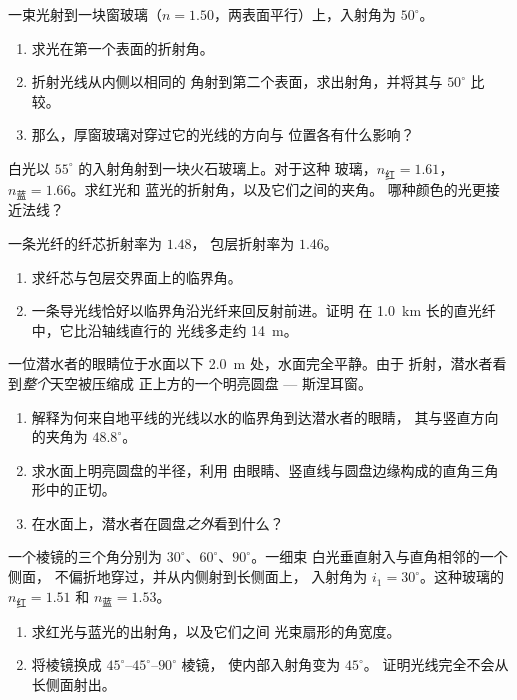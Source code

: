\begin{exercise}[$\star\star$]\label{exo:g10:refraction:9}
一束光射到一块窗玻璃（$n = 1.50$，两表面平行）上，入射角为 $50^\circ$。
\begin{enumerate}
  \item 求光在第一个表面的折射角。
  \item 折射光线从内侧以相同的
        角射到第二个表面，求出射角，并将其与 $50^\circ$ 比较。
  \item 那么，厚窗玻璃对穿过它的光线的方向与
        位置各有什么影响？
\end{enumerate}
\end{exercise}

\begin{exercise}[$\star\star$]\label{exo:g10:refraction:10}
白光以 $55^\circ$ 的入射角射到一块火石玻璃上。对于这种
玻璃，$n_{\text{红}} = 1.61$，$n_{\text{蓝}} = 1.66$。求红光和
蓝光的折射角，以及它们之间的夹角。
哪种颜色的光更接近法线？
\end{exercise}

\begin{exercise}[$\star\star$]\label{exo:g10:refraction:11}
一条光纤的纤芯折射率为 $1.48$，
包层折射率为 $1.46$。
\begin{enumerate}
  \item 求纤芯与包层交界面上的临界角。
  \item 一条导光线恰好以临界角沿光纤来回反射前进。证明
        在 \qty{1.0}{km} 长的直光纤中，它比沿轴线直行的
        光线多走约 \qty{14}{m}。
\end{enumerate}
\end{exercise}

\begin{exercise}[$\star\star\star$]\label{exo:g10:refraction:12}
一位潜水者的眼睛位于水面以下 \qty{2.0}{m} 处，水面完全平静。由于
折射，潜水者看到\emph{整个}天空被压缩成
正上方的一个明亮圆盘 --- 斯涅耳窗。
\begin{enumerate}
  \item 解释为何来自地平线的光线以水的临界角到达潜水者的眼睛，
        其与竖直方向的夹角为 $48.8^\circ$。
  \item 求水面上明亮圆盘的半径，利用
        由眼睛、竖直线与圆盘边缘构成的直角三角形中的正切。
  \item 在水面上，潜水者在圆盘\emph{之外}看到什么？
\end{enumerate}
\end{exercise}

\begin{exercise}[$\star\star\star$]\label{exo:g10:refraction:13}
一个棱镜的三个角分别为 $30^\circ$、$60^\circ$、$90^\circ$。一细束
白光垂直射入与直角相邻的一个侧面，
不偏折地穿过，并从内侧射到长侧面上，
入射角为 $i_1 = 30^\circ$。这种玻璃的 $n_{\text{红}} = 1.51$ 和
$n_{\text{蓝}} = 1.53$。
\begin{enumerate}
  \item 求红光与蓝光的出射角，以及它们之间
        光束扇形的角宽度。
  \item 将棱镜换成 $45^\circ$--$45^\circ$--$90^\circ$ 棱镜，
        使内部入射角变为 $45^\circ$。
        证明光线完全不会从长侧面射出。
\end{enumerate}
\end{exercise}

